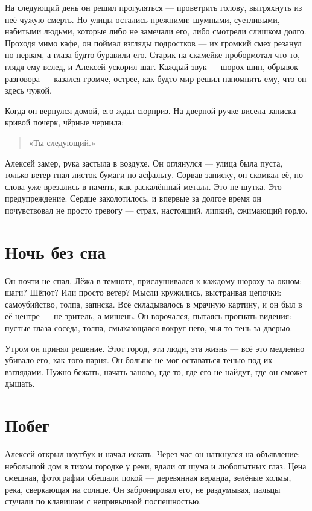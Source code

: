 \documentclass[12pt,a4paper]{book}
\begin{document}
На следующий день он решил прогуляться — проветрить голову, вытряхнуть из неё чужую смерть. Но улицы остались прежними: шумными, суетливыми, набитыми людьми, которые либо не замечали его, либо смотрели слишком долго. Проходя мимо кафе, он поймал взгляды подростков — их громкий смех резанул по нервам, а глаза будто буравили его. Старик на скамейке пробормотал что-то, глядя ему вслед, и Алексей ускорил шаг. Каждый звук — шорох шин, обрывок разговора — казался громче, острее, как будто мир решил напомнить ему, что он здесь чужой.

Когда он вернулся домой, его ждал сюрприз. На дверной ручке висела записка — кривой почерк, чёрные чернила: 

\begin{quote}
«Ты следующий.»
\end{quote}

Алексей замер, рука застыла в воздухе. Он оглянулся — улица была пуста, только ветер гнал листок бумаги по асфальту. Сорвав записку, он скомкал её, но слова уже врезались в память, как раскалённый металл. Это не шутка. Это предупреждение. Сердце заколотилось, и впервые за долгое время он почувствовал не просто тревогу — страх, настоящий, липкий, сжимающий горло.

\section{Ночь без сна}

Он почти не спал. Лёжа в темноте, прислушивался к каждому шороху за окном: шаги? Шёпот? Или просто ветер? Мысли кружились, выстраивая цепочки: самоубийство, толпа, записка. Всё складывалось в мрачную картину, и он был в её центре — не зритель, а мишень. Он ворочался, пытаясь прогнать видения: пустые глаза соседа, толпа, смыкающаяся вокруг него, чья-то тень за дверью.

Утром он принял решение. Этот город, эти люди, эта жизнь — всё это медленно убивало его, как того парня. Он больше не мог оставаться тенью под их взглядами. Нужно бежать, начать заново, где-то, где его не найдут, где он сможет дышать.

\section{Побег}

Алексей открыл ноутбук и начал искать. Через час он наткнулся на объявление: небольшой дом в тихом городке у реки, вдали от шума и любопытных глаз. Цена смешная, фотографии обещали покой — деревянная веранда, зелёные холмы, река, сверкающая на солнце. Он забронировал его, не раздумывая, пальцы стучали по клавишам с непривычной поспешностью.
\end{document}
